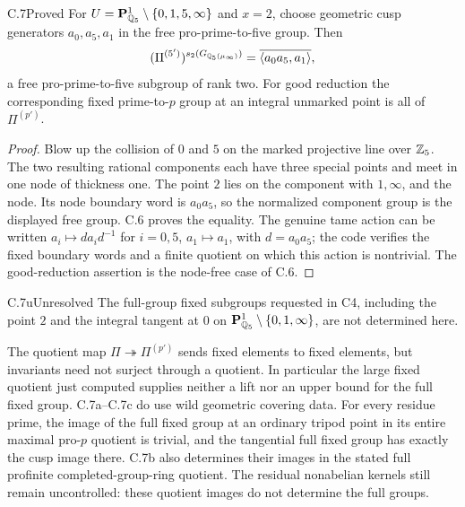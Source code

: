 \begin{claim}{C.7}{Proved}
For $U=\mathbf P^1_{\mathbb Q_5}\setminus\{0,1,5,\infty\}$ and $x=2$, choose
geometric cusp generators $a_0,a_5,a_1$ in the free pro-prime-to-five group.
Then
\[
 (\Pi^{(5')})^{s_2(G_{\mathbb Q_5(\mu_\infty)})}
 =\overline{\langle a_0a_5,a_1\rangle},
\]
a free pro-prime-to-five subgroup of rank two. For good reduction the
corresponding fixed prime-to-$p$ group at an integral unmarked point is
all of $\Pi^{(p')}$.
\end{claim}
\begin{proof}
Blow up the collision of $0$ and $5$ on the marked projective line over
$\mathbb Z_5$. The two resulting rational components each have three special
points and meet in one node of thickness one. The point $2$ lies on the
component with $1,\infty$, and the node. Its node boundary word is
$a_0a_5$, so the normalized component group is the displayed free group.
C.6 proves the equality. The genuine tame action can be written
$a_i\mapsto d a_i d^{-1}$ for $i=0,5$, $a_1\mapsto a_1$, with
$d=a_0a_5$; the code verifies the fixed boundary words and a finite quotient
on which this action is nontrivial. The good-reduction assertion is the
node-free case of C.6.
\end{proof}





\begin{claim}{C.7u}{Unresolved}
The full-group fixed subgroups requested in C4, including the point $2$
and the integral tangent at $0$ on
$\mathbf P^1_{\mathbb Q_5}\setminus\{0,1,\infty\}$, are not determined here.
\end{claim}
The quotient map
$\Pi\twoheadrightarrow\Pi^{(p')}$ sends fixed elements to fixed elements,
but invariants need not surject through a quotient. In particular the large
fixed quotient just computed supplies neither a lift nor an upper bound
for the full fixed group. C.7a--C.7c do use wild geometric covering data. For every residue prime,
the image of the full fixed group at an ordinary tripod point in its
entire maximal pro-$p$ quotient is trivial, and the tangential full fixed
group has exactly the cusp image there. C.7b also determines their images
in the stated full profinite completed-group-ring quotient. The residual
nonabelian kernels still remain uncontrolled: these quotient images do
not determine the full groups.

